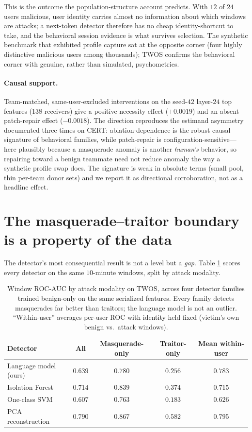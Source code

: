 \documentclass[10pt]{article}
\begin{document}
This is the outcome the population-structure account predicts. With $12$ of
$24$ users malicious, user identity carries almost no information about which
windows are attacks; a next-token detector therefore has no cheap
identity-shortcut to take, and the behavioral session evidence is what
survives selection. The synthetic benchmark that exhibited profile capture sat
at the opposite corner (four highly distinctive malicious users among
thousands); TWOS confirms the behavioral corner with genuine, rather than
simulated, psychometrics.

\paragraph{Causal support.} Team-matched, same-user-excluded interventions on
the seed-$42$ layer-$24$ top features ($138$ receivers) give a positive
necessity effect ($+0.0019$) and an absent patch-repair effect ($-0.0018$).
The direction reproduces the estimand asymmetry documented three times on CERT:
ablation-dependence is the robust causal signature of behavioral families,
while patch-repair is configuration-sensitive---here plausibly because a
masquerade anomaly is another \emph{human's} behavior, so repairing toward a
benign teammate need not reduce anomaly the way a synthetic profile swap does.
The signature is weak in absolute terms (small pool, thin per-team donor sets)
and we report it as directional corroboration, not as a headline effect.

\section{The masquerade--traitor boundary is a property of the data}

The detector's most consequential result is not a level but a \emph{gap}. Table
\ref{tab:boundary} scores every detector on the same $10$-minute windows, split
by attack modality.

\begin{table}[t]
\centering
\caption{Window ROC-AUC by attack modality on TWOS, across four detector
families trained benign-only on the same serialized features. Every family
detects masquerades far better than traitors; the language model is not an
outlier. ``Within-user'' averages per-user ROC with identity held fixed
(victim's own benign vs.\ attack windows).}
\label{tab:boundary}
\begin{tabular}{lcccc}
\toprule
Detector & All & Masquerade-only & Traitor-only & Mean within-user \\
\midrule
Language model (ours) & $0.639$ & $0.780$ & $0.256$ & $\mathbf{0.783}$ \\
Isolation Forest      & $0.714$ & $0.839$ & $0.374$ & $0.715$ \\
One-class SVM         & $0.607$ & $0.763$ & $0.183$ & $0.626$ \\
PCA reconstruction    & $0.790$ & $0.867$ & $0.582$ & $0.795$ \\
\bottomrule
\end{tabular}
\end{table}
\end{document}
